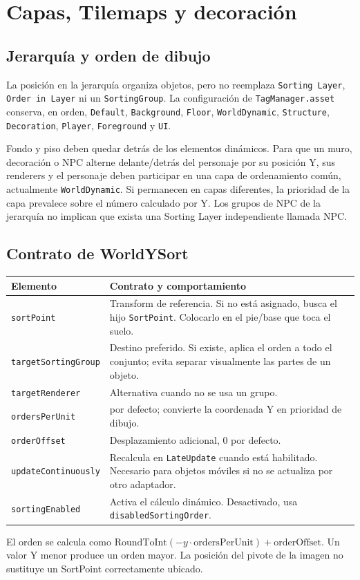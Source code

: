 \documentclass[11pt,letterpaper,oneside]{article}
\makeatletter
\newcommand{\code}[1]{\nolinkurl{#1}}
\newenvironment{spec}{\begingroup\small\begin{longtable}{@{}>{\raggedright\arraybackslash}p{0.32\textwidth}>{\raggedright\arraybackslash}p{0.64\textwidth}@{}}\toprule\textbf{Elemento} & \textbf{Contrato y comportamiento} \\ \midrule\endhead}{\bottomrule\end{longtable}\endgroup}
\makeatother
\begin{document}
\section{Capas, Tilemaps y decoración}
\subsection{Jerarquía y orden de dibujo}
La posición en la jerarquía organiza objetos, pero no reemplaza \code{Sorting Layer}, \code{Order in Layer} ni un \code{SortingGroup}. La configuración de \code{TagManager.asset} conserva, en orden, \code{Default}, \code{Background}, \code{Floor}, \code{WorldDynamic}, \code{Structure}, \code{Decoration}, \code{Player}, \code{Foreground} y \code{UI}.

Fondo y piso deben quedar detrás de los elementos dinámicos. Para que un muro, decoración o NPC alterne delante/detrás del personaje por su posición Y, sus renderers y el personaje deben participar en una capa de ordenamiento común, actualmente \code{WorldDynamic}. Si permanecen en capas diferentes, la prioridad de la capa prevalece sobre el número calculado por Y. Los grupos de NPC de la jerarquía no implican que exista una Sorting Layer independiente llamada NPC.

\subsection{Contrato de WorldYSort}
\begin{spec}
\code{sortPoint} & Transform de referencia. Si no está asignado, busca el hijo \code{SortPoint}. Colocarlo en el pie/base que toca el suelo. \\
\code{targetSortingGroup} & Destino preferido. Si existe, aplica el orden a todo el conjunto; evita separar visualmente las partes de un objeto. \\
\code{targetRenderer} & Alternativa cuando no se usa un grupo. \\
\code{ordersPerUnit} & 100 por defecto; convierte la coordenada Y en prioridad de dibujo. \\
\code{orderOffset} & Desplazamiento adicional, 0 por defecto. \\
\code{updateContinuously} & Recalcula en \code{LateUpdate} cuando está habilitado. Necesario para objetos móviles si no se actualiza por otro adaptador. \\
\code{sortingEnabled} & Activa el cálculo dinámico. Desactivado, usa \code{disabledSortingOrder}. \\
\end{spec}
El orden se calcula como \(\mathrm{RoundToInt}(-y\cdot\mathrm{ordersPerUnit})+\mathrm{orderOffset}\). Un valor Y menor produce un orden mayor. La posición del pivote de la imagen no sustituye un SortPoint correctamente ubicado.
\end{document}
